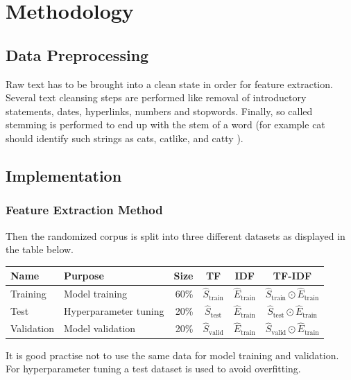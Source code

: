 \documentclass[a4paper,12pt,nottoc]{article}
\begin{document}
\section{Methodology}

\subsection{Data Preprocessing}\label{chap:data-preproc}

Raw text has to be brought into a clean state in order for feature extraction. Several text cleansing steps are performed like removal of introductory statements, dates, hyperlinks, numbers and stopwords. Finally, so called stemming is performed to end up with the stem of a word (for example cat should identify such strings as cats, catlike, and catty \cite{bib:stemming}).

\subsection{Implementation}

\subsubsection{Feature Extraction Method}

Then the randomized corpus is split into three different datasets as displayed in the table below.

\begin{center}
\begin{tabular}{| l | l | r | c | c | c |}
\hline
Name & Purpose & Size & TF & IDF & TF-IDF \\
\hline
Training & Model training & 60\% & $\hat{S}_{\textrm{train}}$ & $\hat{E}_{\textrm{train}}$ & $\hat{S}_{\textrm{train}} \odot \hat{E}_{\textrm{train}}$ \\  
Test & Hyperparameter tuning & 20\% & $\hat{S}_{\textrm{test}}$ & $\hat{E}_{\textrm{train}}$ & $\hat{S}_{\textrm{test}} \odot \hat{E}_{\textrm{train}}$ \\    
Validation & Model validation & 20\% & $\hat{S}_{\textrm{valid}}$ & $\hat{E}_{\textrm{train}}$ & $\hat{S}_{\textrm{valid}} \odot \hat{E}_{\textrm{train}}$ \\
\hline 
\end{tabular}
\end{center}

\noindent It is good practise not to use the same data for model training and validation. For hyperparameter tuning a test dataset is used to avoid overfitting.\\
\end{document}
